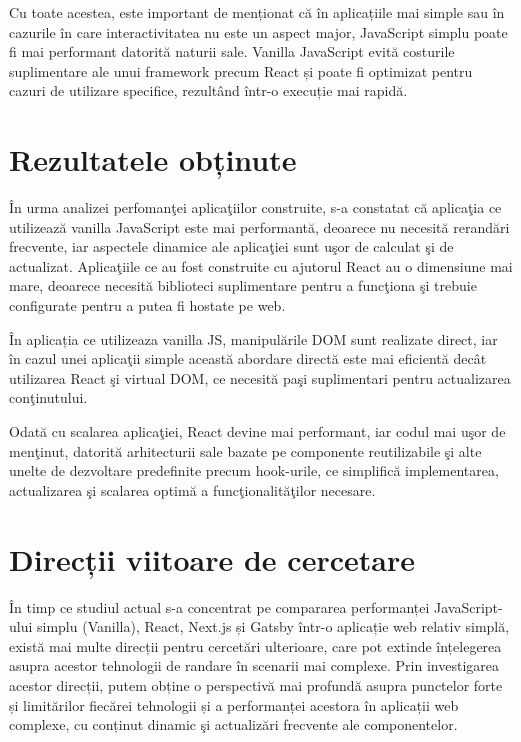 \documentclass[12pt, a4paper]{report}
\begin{document}
Cu toate acestea, este important de menționat că în aplicațiile mai simple sau în cazurile în care interactivitatea nu este un aspect major, JavaScript simplu poate fi mai performant datorită naturii sale. Vanilla JavaScript evită costurile suplimentare ale unui framework precum React și poate fi optimizat pentru cazuri de utilizare specifice, rezultând \^intr-o  execuție mai rapidă.

\section{Rezultatele obținute}

\^In urma analizei perfoman\c tei aplica\c tiilor construite, s-a constatat c\u a aplica\c tia ce utilizează vanilla JavaScript este mai performant\u a, deoarece nu necesit\u a rerand\u ari frecvente, iar aspectele dinamice ale aplica\c tiei sunt u\c sor de calculat \c si de actualizat. Aplica\c tiile ce au fost construite cu ajutorul React au o dimensiune mai mare, deoarece necesit\u a biblioteci suplimentare pentru a func\c tiona \c si trebuie configurate pentru a putea fi hostate pe web.

\^In aplicația ce utilizeaza vanilla JS, manipul\u arile DOM sunt realizate direct, iar \^in cazul unei aplica\c tii simple aceast\u a abordare direct\u a este mai eficient\u a dec\^at utilizarea React \c si virtual DOM, ce necesit\u a pa\c si suplimentari pentru actualizarea con\c tinutului.

Odată cu scalarea aplica\c tiei, React devine mai performant, iar codul mai u\c sor de men\c tinut, datorit\u a arhitecturii sale bazate pe componente reutilizabile \c si alte unelte de dezvoltare predefinite precum hook-urile, ce simplifică implementarea, actualizarea \c si scalarea optim\u a a func\c tionalit\u a\c tilor necesare.

\section {Direcții viitoare de cercetare}

În timp ce studiul actual s-a concentrat pe compararea performanței JavaScript-ului simplu (Vanilla), React, Next.js și Gatsby într-o aplicație web relativ simplă, există mai multe direcții pentru cercet\u ari ulterioare, care pot extinde înțelegerea asupra acestor tehnologii de randare în scenarii mai complexe. Prin investigarea acestor direcții, putem obține o perspectivă mai profundă asupra punctelor forte și limitărilor fiecărei tehnologii și a performanței acestora în aplicații web complexe, cu conținut dinamic \c si actualiz\u ari frecvente ale componentelor.
\end{document}
